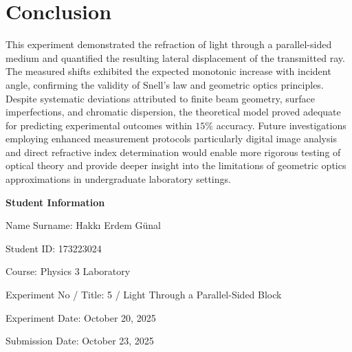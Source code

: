 \documentclass[12pt, a4paper]{article}
\begin{document}
\section{Conclusion}

This experiment demonstrated the refraction of light through a parallel-sided medium and quantified the resulting lateral displacement of the transmitted ray. The measured shifts exhibited the expected monotonic increase with incident angle, confirming the validity of Snell's law and geometric optics principles. Despite systematic deviations attributed to finite beam geometry, surface imperfections, and chromatic dispersion, the theoretical model proved adequate for predicting experimental outcomes within $15\%$ accuracy. Future investigations employing enhanced measurement protocols particularly digital image analysis and direct refractive index determination would enable more rigorous testing of optical theory and provide deeper insight into the limitations of geometric optics approximations in undergraduate laboratory settings.

\newpage

\textbf{Student Information}

Name Surname: Hakkı Erdem Günal

Student ID: 173223024

Course: Physics 3 Laboratory

Experiment No / Title: 5 / Light Through a Parallel-Sided Block

Experiment Date: October 20, 2025

Submission Date: October 23, 2025
\end{document}
